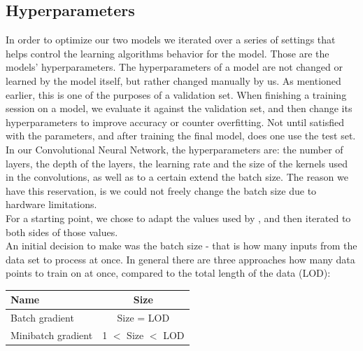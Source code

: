 \begin{multicols}{2}
\subsection{Hyperparameters}
In order to optimize our two models we iterated over a series of settings that helps control the learning algorithms behavior for the model. Those are the models' hyperparameters.
The hyperparameters of a model are not changed or learned by the model itself, but rather changed manually by us. As mentioned earlier, this is one of the purposes of a validation set. 
When finishing a training session on a model, we evaluate it against the validation set, and then change its hyperparameters to improve accuracy or counter overfitting. Not until satisfied with the parameters, and after training the final model, does one use the test set. \citep{goodfellow-et-al-2016} In our Convolutional Neural Network, the hyperparameters are: the number of layers, the depth of the layers, the learning rate and the size of the kernels used in the convolutions, as well as to a certain extend the batch size. The reason we have this reservation, is we could not freely change the batch size due to hardware limitations.\\
For a starting point, we chose to adapt the values used by \citeauthor{wang-et-al-2016}, and then iterated to both sides of those values.\\
An initial decision to make was the batch size - that is how many inputs from the data set to process at once. In general there are three approaches how many data points to train on at once, compared to the total length of the data (LOD):
\begin{center}
\begin{tabular}{l|c}
\hline 
Name & Size \\ 
\hline 
Batch gradient & Size = LOD \\ 

Minibatch gradient & 1 $<$ Size $<$ LOD \\ 


\end{tabular}
\end{center}
\end{multicols}
